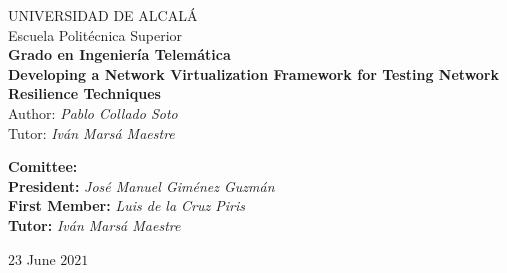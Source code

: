 \begin{center}
    {\Huge UNIVERSIDAD DE ALCALÁ}\\
    \vspace{0.5cm}
    {\huge Escuela Politécnica Superior}\\
    \vspace{1.5cm}
    {\Large \textbf{Grado en Ingeniería Telemática}}\\
    \vspace{3cm}
    {\Large \textbf{Developing a Network Virtualization Framework for Testing Network Resilience Techniques}}\\
    \vspace{1.5cm}
    {\large Author: \textit{Pablo Collado Soto}}\\
    \vspace{2.5mm}
    {\large Tutor: \textit{Iván Marsá Maestre}}\\
    \vspace{2cm}
\end{center}

\begin{flushleft}
    {\large \textbf{Comittee:}}\\
    \vspace{1cm}
    {\large \hspace{2cm} \textbf{President:} \hspace{9mm} \textit{José Manuel Giménez Guzmán}}\\
    \vspace{0.5cm}
    {\large \hspace{2cm} \textbf{First Member:} \textit{Luis de la Cruz Piris}}\\
    \vspace{0.5cm}
    {\large \hspace{2cm} \textbf{Tutor:} \hspace{18mm} \textit{Iván Marsá Maestre}}\\
    \vspace{6cm}
\end{flushleft}

\begin{center}
    $23$ June $2021$
\end{center}

\clearpage
